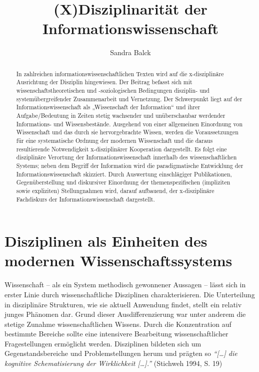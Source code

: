 \documentclass[a4paper,
fontsize=11pt,
oneside,
numbers=noperiodatend,
parskip=half-,
bibliography=totoc,
final
]{scrartcl}
\title{\LARGE{(X)Disziplinarität der Informationswissenschaft}} %
\author{Sandra Balck} %
\date{}
\begin{document}
\maketitle
\thispagestyle{fancyplain} 

\begin{abstract}
In zahlreichen informationswissenschaftlichen Texten wird auf die
x-disziplinäre Ausrichtung der Disziplin hingewiesen. Der Beitrag
befasst sich mit wissenschaftstheoretischen und -soziologischen
Bedingungen disziplin- und systemübergreifender Zusammenarbeit und
Vernetzung. Der Schwerpunkt liegt auf der Informationswissenschaft als
„Wissenschaft der Information`` und ihrer Aufgabe/Bedeutung in Zeiten
stetig wachsender und unüberschaubar werdender Informations- und
Wissensbestände. Ausgehend von einer allgemeinen Einordnung von
Wissenschaft und das durch sie hervorgebrachte Wissen, werden die
Voraussetzungen für eine systematische Ordnung der modernen Wissenschaft
und die daraus resultierende Notwendigkeit x-disziplinärer Kooperation
dargestellt. Es folgt eine disziplinäre Verortung der
Informationswissenschaft innerhalb des wissenschaftlichen Systems; neben
dem Begriff der Information wird die paradigmatische Entwicklung der
Informationswissenschaft skizziert. Durch Auswertung einschlägiger
Publikationen, Gegenüberstellung und diskursiver Einordnung der
themenspezifischen (impliziten sowie expliziten) Stellungnahmen wird,
darauf aufbauend, der x-disziplinäre Fachdiskurs der
Informationswissenschaft dargestellt.
\end{abstract}

\section*{Disziplinen als Einheiten des modernen
Wissenschaftssystems}\label{disziplinen-als-einheiten-des-modernen-wissenschaftssystems}

Wissenschaft -- als ein System methodisch gewonnener Aussagen -- lässt
sich in erster Linie durch wissenschaftliche Disziplinen
charakterisieren. Die Unterteilung in disziplinäre Strukturen, wie sie
aktuell Anwendung findet, stellt ein relativ junges Phänomen dar. Grund
dieser Ausdifferenzierung war unter anderem die stetige Zunahme
wissenschaftlichen Wissens. Durch die Konzentration auf bestimmte
Bereiche sollte eine intensivere Bearbeitung wissenschaftlicher
Fragestellungen ermöglicht werden. Disziplinen bildeten sich um
Gegenstandsbereiche und Problemstellungen herum und prägten so
\emph{\enquote{{[}\ldots{}{]} die kognitive Schematisierung der
Wirklichkeit {[}\ldots{}{]}.}} (Stichweh 1994, S. 19)
\end{document}
